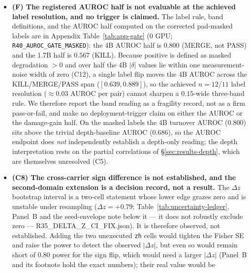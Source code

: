 \documentclass{article}
\begin{document}
\begin{itemize}
        $\approx 14\%$ / $\approx 13.5\%$, below the $30\%$ gate; reaching $30\%$ would require a
        fallback PPL below the clean (fully-restored) floor. The gain half is therefore
        argued-not-achievable on the measured data, though a definitive negative would need a
        fallback-baseline forward that was not run. Either way this paper makes no claim of having
        passed the registered gate.
  \item \textbf{(F) The registered AUROC half is not evaluable at the achieved label resolution,
        and no trigger is claimed.} The label rule, band definitions, and the AUROC half computed
        on the corrected pad-masked labels are in Appendix Table~\ref{tab:app-gate} (0 GPU;
        \texttt{R40\_AUROC\_GATE\_MASKED}): the 4B AUROC half is $0.800$ (MERGE, not PASS) and the
        1.7B half is $0.567$ (KILL). Because positive is defined as masked degradation $>0$ and over
        half the 4B $|\delta|$ values lie within one measurement-noise width of zero (C12), a
        single label flip moves the 4B AUROC across the KILL/MERGE/PASS span ($[0.639,0.889]$), so
        the achieved $n{=}12$/$11$ label resolution ($\approx 0.03$ AUROC per pair) cannot
        sharpen a $0.15$-wide three-band rule. We therefore report the band reading as a fragility
        record, not as a firm pass-or-fail, and make no deployment-trigger claim on either the
        AUROC or the damage-gain half. On the masked labels the 4B turnover AUROC ($0.800$) sits
        above the trivial depth-baseline AUROC ($0.686$), so the AUROC endpoint does \emph{not}
        independently establish a depth-only reading; the depth interpretation rests on the
        partial correlations of \S\ref{sec:results-depth}, which are themselves unresolved (C5).
  \item \textbf{(C8) The cross-carrier sign difference is not established, and the second-domain
        extension is a decision record, not a result.} The $\Delta z$ bootstrap interval is a
        two-cell statement whose lower edge grazes zero and is unstable under resampling
        ($\Delta z=+0.79$; Table~\ref{tab:uncertainty-ledger}, Panel~B and the seed-envelope
        note below it --- it does not robustly exclude zero --- R35\_DELTA\_Z\_CI\_FIX.json). It
        is therefore observed, not established. Adding the two unexecuted \texttt{zh} cells
        would tighten the Fisher SE and raise the power to detect the observed $|\Delta z|$, but
        even so would remain short of $0.80$ power for the sign flip, which would need a larger
        $|\Delta z|$ (Panel~B and its footnote hold the exact numbers); their real value would be

\end{itemize}
\end{document}
